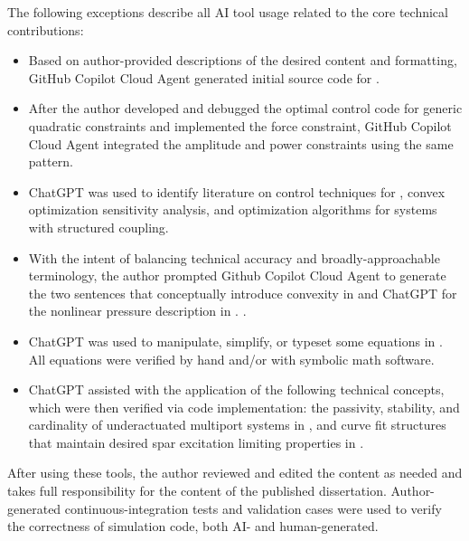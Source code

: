 The following exceptions describe all AI tool usage related to the core technical contributions:
\begin{itemize}[leftmargin=*]
\item Based on author-provided descriptions of the desired content and formatting,
      GitHub Copilot Cloud Agent generated initial source code for
      .
\item After the author developed and debugged the optimal control code for generic quadratic constraints and implemented the force constraint,
      GitHub Copilot Cloud Agent integrated the amplitude and power constraints using the same pattern.
\item ChatGPT was used to identify literature on control techniques for ,
      convex optimization sensitivity analysis,
      and optimization algorithms for systems with structured coupling.
\item With the intent of balancing technical accuracy and broadly-approachable terminology,
      the author prompted Github Copilot Cloud Agent to generate the two sentences that conceptually introduce convexity in 
      \ifdefined\DISSERTATION
          and ChatGPT for the nonlinear pressure description in .
      \else
          .
      \fi
\item ChatGPT was used to manipulate, simplify, or typeset some equations in 
      .
      All equations were verified by hand and/or with symbolic math software.
\item ChatGPT assisted with the application of the following technical concepts, which were then verified via code implementation:
      the passivity, stability, and cardinality of underactuated multiport systems in ,
      and curve fit structures that maintain desired spar excitation limiting properties in .
\end{itemize}
After using these tools, the author reviewed and edited the content as needed and takes full responsibility for the content of the published dissertation.
Author-generated continuous-integration tests and validation cases were used to verify the correctness of simulation code, both AI- and human-generated.

